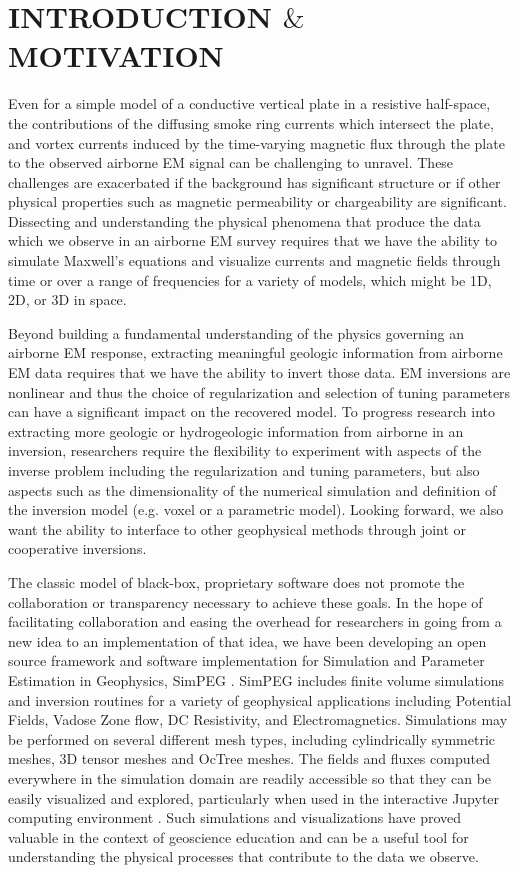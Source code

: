 \documentclass[paper]{geophysics}
\begin{document}
\section{INTRODUCTION $\&$ MOTIVATION}
Even for a simple model of a conductive vertical plate in a resistive half-space, the contributions of the diffusing smoke ring currents which intersect the plate, and vortex currents induced by the time-varying magnetic flux through the plate to the observed airborne EM signal can be challenging to unravel. These challenges are exacerbated if the background has significant structure or if other physical properties such as magnetic permeability or chargeability are significant. Dissecting and understanding the physical phenomena that produce the data which we observe in an airborne EM survey requires that we have the ability to simulate Maxwell's equations and visualize currents and magnetic fields through time or over a range of frequencies for a variety of models, which might be 1D, 2D, or 3D in space.

Beyond building a fundamental understanding of the physics governing an airborne EM response, extracting meaningful geologic information from airborne EM data requires that we have the ability to invert those data. EM inversions are nonlinear and thus the choice of regularization and selection of tuning parameters can have a significant impact on the recovered model. To progress research into extracting more geologic or hydrogeologic information from airborne in an inversion, researchers require the flexibility to experiment with aspects of the inverse problem including the regularization and tuning parameters, but also aspects such as the dimensionality of the numerical simulation and definition of the inversion model (e.g. voxel or a parametric model). Looking forward, we also want the ability to interface to other geophysical methods through joint or cooperative inversions.

The classic model of black-box, proprietary software does not promote the collaboration or transparency necessary to achieve these goals. In the hope of facilitating collaboration and easing the overhead for researchers in going from a new idea to an implementation of that idea, we have been developing an open source framework and software implementation for Simulation and Parameter Estimation in Geophysics, SimPEG \citep{cockett2015}. SimPEG includes finite volume simulations and inversion routines for a variety of geophysical applications including Potential Fields, Vadose Zone flow, DC Resistivity, and Electromagnetics. Simulations may be performed on several different mesh types, including cylindrically symmetric meshes, 3D tensor meshes and OcTree meshes. The fields and fluxes computed everywhere in the simulation domain are readily accessible so that they can be easily visualized and explored, particularly when used in the interactive Jupyter computing environment \citep{Perez2015}. Such simulations and visualizations have proved valuable in the context of geoscience education \citep{Oldenburg2017} and can be a useful tool for understanding the physical processes that contribute to the data we observe.
\end{document}
